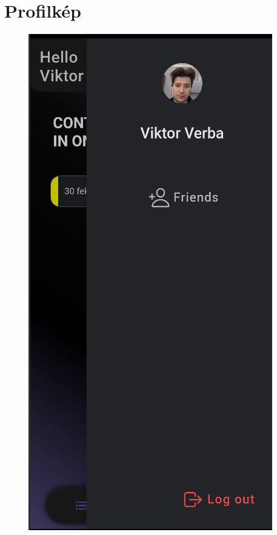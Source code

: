 \documentclass[12pt]{report}
\begin{document}
\section{Profilkép}
\begin{figure}[H]
    \centering

    \begin{minipage}[b]{0.3\textwidth}
        \centering
        \includegraphics[width=\linewidth]{src/friends1.png}

\end{minipage}
\end{figure}
\end{document}
